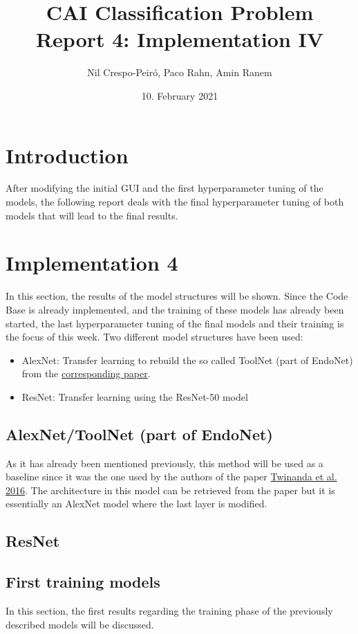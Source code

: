 \documentclass{article}
\title{CAI Classification Problem\\Report 4: Implementation IV}
\author{Nil Crespo-Peiró, Paco Rahn, Amin Ranem}
\date{10. February 2021}
\begin{document}
\maketitle

\section{Introduction}
After modifying the initial GUI and the first hyperparameter tuning of the models, the following report deals with the final hyperparameter tuning of both models that will lead to the final results. 

\section{Implementation 4}
In this section, the results of the model structures will be shown. Since the Code Base is already implemented, and the training of these models has already been started, the last hyperparameter tuning of the final models and their training is the focus of this week. Two different model structures have been used:
\begin{itemize}
    \item AlexNet: Transfer learning to rebuild the so called ToolNet (part of EndoNet) from the \href{https://arxiv.org/pdf/1602.03012.pdf}{corresponding paper}.
    \item ResNet: Transfer learning using the ResNet-50 model
\end{itemize}

\subsection{AlexNet/ToolNet (part of EndoNet)}
As it has already been mentioned previously, this method will be used as a baseline since it was the one used by the authors of the paper \href{https://arxiv.org/pdf/1602.03012.pdf}{Twinanda et al. 2016}. The architecture in this model can be retrieved from the paper but it is essentially an AlexNet model where the last layer is modified.


\subsection{ResNet}

\subsection{First training models}
In this section, the first results regarding the training phase of the previously described models will be discussed.
\end{document}
